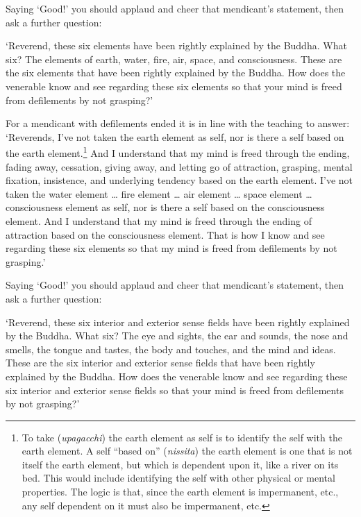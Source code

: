\documentclass[12pt,openany]{book}%
\begin{document}
Saying ‘Good!’ you should applaud and cheer that mendicant’s statement, then ask a further question: 

‘Reverend, these six elements have been rightly explained by the Buddha. What six? The elements of earth, water, fire, air, space, and consciousness. These are the six elements that have been rightly explained by the Buddha. How does the venerable know and see regarding these six elements so that your mind is freed from defilements by not grasping?’ 

For a mendicant with defilements ended it is in line with the teaching to answer: ‘Reverends, I’ve not taken the earth element as self, nor is there a self based on the earth element.\footnote{To take (\textit{upagacchi}) the earth element as self is to identify the self with the earth element. A self “based on” (\textit{nissita}) the earth element is one that is not itself the earth element, but which is dependent upon it, like a river on its bed. This would include identifying the self with other physical or mental properties. The logic is that, since the earth element is impermanent, etc., any self dependent on it must also be impermanent, etc. } And I understand that my mind is freed through the ending, fading away, cessation, giving away, and letting go of attraction, grasping, mental fixation, insistence, and underlying tendency based on the earth element. I’ve not taken the water element … fire element … air element … space element … consciousness element as self, nor is there a self based on the consciousness element. And I understand that my mind is freed through the ending of attraction based on the consciousness element. That is how I know and see regarding these six elements so that my mind is freed from defilements by not grasping.’ 

Saying ‘Good!’ you should applaud and cheer that mendicant’s statement, then ask a further question: 

‘Reverend, these six interior and exterior sense fields have been rightly explained by the Buddha. What six? The eye and sights, the ear and sounds, the nose and smells, the tongue and tastes, the body and touches, and the mind and ideas. These are the six interior and exterior sense fields that have been rightly explained by the Buddha. How does the venerable know and see regarding these six interior and exterior sense fields so that your mind is freed from defilements by not grasping?’ 
\end{document}
